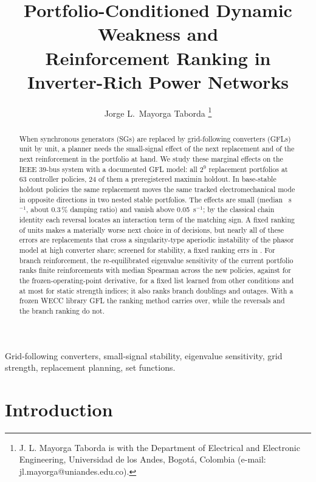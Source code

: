 \documentclass[journal]{IEEEtran}
\title{Portfolio-Conditioned Dynamic Weakness and\\ Reinforcement Ranking in
Inverter-Rich Power Networks}
\author{Jorge L.~Mayorga Taborda%
\thanks{J. L. Mayorga Taborda is with the Department of Electrical and
Electronic Engineering, Universidad de los Andes, Bogot\'a, Colombia
(e-mail: jl.mayorga@uniandes.edu.co).}%
}
\theoremstyle{remark}
\begin{document}
\maketitle

\begin{abstract}
When synchronous generators (SGs) are replaced by grid-following converters
(GFLs) unit by unit, a planner needs the small-signal effect of the next
replacement and of the next reinforcement in the portfolio at hand. We study
these marginal effects on the IEEE 39-bus system with a documented GFL model:
all $2^9$ replacement portfolios at 63 controller policies, 24 of them a
preregistered maximin holdout. In \cntDNew{} base-stable holdout policies the
same replacement moves the same tracked electromechanical mode in opposite
directions in two nested stable portfolios. The effects are small (median
\revDmed~s$^{-1}$, about 0.3\,\% damping ratio) and vanish above
0.05~s$^{-1}$; by the classical chain identity each reversal locates an
interaction term of the matching sign. A fixed ranking of units makes a
materially worse next choice in \regretFULLNew{} of decisions, but nearly all of
these errors are replacements that cross a singularity-type aperiodic
instability of the phasor model at high converter share; screened for stability,
a fixed ranking errs in \regScreened. For branch reinforcement, the
re-equilibrated eigenvalue sensitivity of the current portfolio ranks finite
reinforcements with median Spearman \gbnewpoliciesmedianrhoDtotal{} across the
new policies, against \gbnewpoliciesmedianrhoDfrozen{} for the frozen-operating-point
derivative, \locoNew{} for a fixed list learned from other conditions and at
most \gbnewpoliciesmedianrhooraclestatic{} for static strength indices; it also
ranks branch doublings and outages. With a frozen WECC library GFL the ranking
method carries over, while the reversals and the branch ranking do not.
\end{abstract}

\begin{IEEEkeywords}
Grid-following converters, small-signal stability, eigenvalue sensitivity,
grid strength, replacement planning, set functions.
\end{IEEEkeywords}

\section{Introduction}
\end{document}
